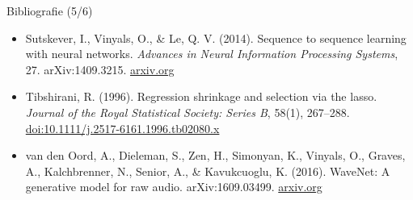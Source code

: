 \begin{frame}{Bibliografie (5/6)}
\begin{itemize}
    \item Sutskever, I., Vinyals, O., \& Le, Q. V. (2014). Sequence to sequence learning with neural networks. \textit{Advances in Neural Information Processing Systems}, 27. arXiv:1409.3215. \href{https://arxiv.org/abs/1409.3215}{arxiv.org}
    \item Tibshirani, R. (1996). Regression shrinkage and selection via the lasso. \textit{Journal of the Royal Statistical Society: Series B}, 58(1), 267--288. \href{https://doi.org/10.1111/j.2517-6161.1996.tb02080.x}{doi:10.1111/j.2517-6161.1996.tb02080.x}
    \item van den Oord, A., Dieleman, S., Zen, H., Simonyan, K., Vinyals, O., Graves, A., Kalchbrenner, N., Senior, A., \& Kavukcuoglu, K. (2016). WaveNet: A generative model for raw audio. arXiv:1609.03499. \href{https://arxiv.org/abs/1609.03499}{arxiv.org}
\end{itemize}
\end{frame}

